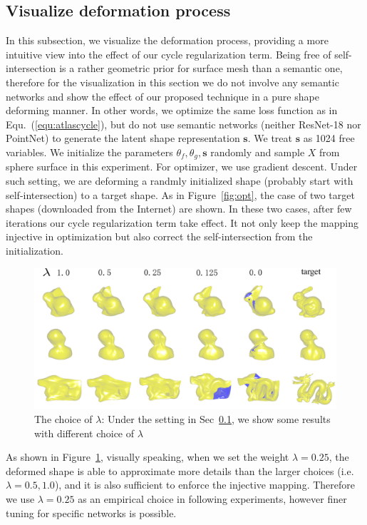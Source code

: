 \subsection{Visualize deformation process}
\label{subsec:deform}
In this subsection, we visualize the deformation process, providing a more intuitive view into the effect of our cycle regularization term. Being free of self-intersection is a rather geometric prior for surface mesh than a semantic one, therefore for the visualization in this section we do not involve any semantic networks and show the effect of our proposed technique in a pure shape deforming manner. In other words, we optimize the same loss function as in Equ.~(\ref{equ:atlascycle}), but do not use semantic networks (neither ResNet-18\cite{resnet} nor PointNet\cite{pointnet}) to generate the latent shape representation $\mathbf{s}$. We treat $\mathbf{s}$ as 1024 free variables. We initialize the parameters $\theta_f,\theta_g,\mathbf{s}$ randomly and sample $X$ from sphere surface in this experiment. For optimizer, we use gradient descent. Under such setting, we are deforming a randmly initialized shape (probably start with self-intersection) to a target shape. As in Figure~\ref{fig:opt}, the case of two target shapes (downloaded from the Internet) are shown. In these two cases, after few iterations our cycle regularization term take effect. It not only keep the mapping injective in optimization but also correct the self-intersection from the initialization.

\begin{figure}[htbp]
	\centering
	\includegraphics[width=\linewidth]{img/opt/lambda}
	\caption{The choice of $\lambda$: Under the setting in Sec~\ref{subsec:deform}, we show some results with different choice of $\lambda$}
	\label{fig:lambda}
\end{figure}

As shown in Figure~\ref{fig:lambda}, visually speaking, when we set the weight $\lambda=0.25$, the deformed shape is able to approximate more details than the larger choices (i.e. $\lambda=0.5,1.0$), and it is also sufficient to enforce the injective mapping.  Therefore we use $\lambda=0.25$ as an empirical choice in following experiments, however finer tuning for specific networks is possible. 
